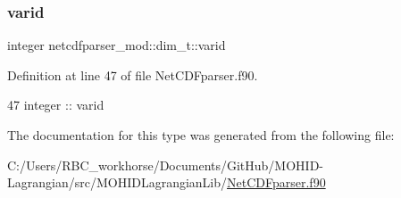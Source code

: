 \subsubsection{\texorpdfstring{varid}{varid}}
{\footnotesize\ttfamily integer netcdfparser\+\_\+mod\+::dim\+\_\+t\+::varid\hspace{0.3cm}{\ttfamily [private]}}



Definition at line 47 of file Net\+C\+D\+Fparser.\+f90.


\begin{DoxyCode}
47         \textcolor{keywordtype}{integer} :: varid
\end{DoxyCode}


The documentation for this type was generated from the following file\+:\begin{DoxyCompactItemize}
\item 
C\+:/\+Users/\+R\+B\+C\+\_\+workhorse/\+Documents/\+Git\+Hub/\+M\+O\+H\+I\+D-\/\+Lagrangian/src/\+M\+O\+H\+I\+D\+Lagrangian\+Lib/\mbox{\hyperlink{_net_c_d_fparser_8f90}{Net\+C\+D\+Fparser.\+f90}}\end{DoxyCompactItemize}

